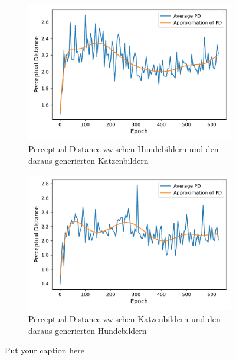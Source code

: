   \begin{figure}[ht]
 	\centering
 	\begin{subfigure}{\textwidth}
 		\centering
 		\includegraphics[width=.8\linewidth]{images/plot_line_plot_fidsdogcat}  
 		\caption{Perceptual Distance zwischen Hundebildern und den daraus generierten Katzenbildern}
 		\label{fig:sub-dogtocatpd}
 	\end{subfigure}
 	\newline
 	\begin{subfigure}{\textwidth}
 		\centering
 		\includegraphics[width=.8\linewidth]{images/plot_line_plot_fidscatdog}  
 		\caption{Perceptual Distance zwischen Katzenbildern und den daraus generierten Hundebildern}
 		\label{fig:sub-cattodogpd}
 	\end{subfigure}
 	\caption{Put your caption here}
 	\label{fig:fig}
 \end{figure}